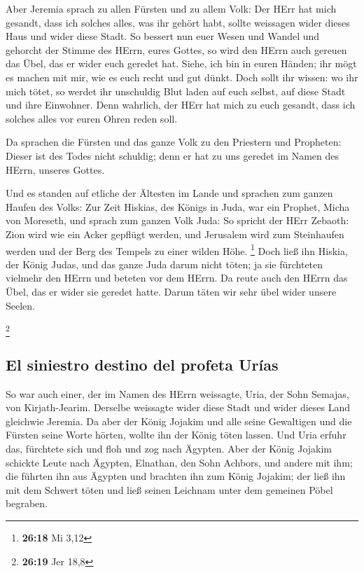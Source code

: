  Aber Jeremia sprach zu allen Fürsten und zu allem Volk:
Der HErr hat mich gesandt, dass ich solches alles, was ihr gehört habt,
sollte weissagen wider dieses Haus und wider diese Stadt.
 So bessert nun euer Wesen und Wandel und gehorcht der
Stimme des HErrn, eures Gottes, so wird den HErrn auch gereuen das Übel,
das er wider euch geredet hat.  Siehe, ich bin in euren
Händen; ihr mögt es machen mit mir, wie es euch recht und gut dünkt.
 Doch sollt ihr wissen: wo ihr mich tötet, so werdet ihr
unschuldig Blut laden auf euch selbst, auf diese Stadt und ihre
Einwohner. Denn wahrlich, der HErr hat mich zu euch gesandt, dass ich
solches alles vor euren Ohren reden soll.

 Da sprachen die Fürsten und das ganze Volk zu den
Priestern und Propheten: Dieser ist des Todes nicht schuldig; denn er
hat zu uns geredet im Namen des HErrn, unseres Gottes.

 Und es standen auf etliche der Ältesten im Lande und
sprachen zum ganzen Haufen des Volks:  Zur Zeit Hiskias,
des Königs in Juda, war ein Prophet, Micha von Moreseth, und sprach zum
ganzen Volk Juda: So spricht der HErr Zebaoth: Zion wird wie ein Acker
gepflügt werden, und Jerusalem wird zum Steinhaufen werden und der Berg
des Tempels zu einer wilden Höhe. \footnote{\textbf{26:18} Mi 3,12}
 Doch ließ ihn Hiskia, der König Judas, und das ganze
Juda darum nicht töten; ja sie fürchteten vielmehr den HErrn und beteten
vor dem HErrn. Da reute auch den HErrn das Übel, das er wider sie
geredet hatte. Darum täten wir sehr übel wider unsere Seelen.

\footnote{\textbf{26:19} Jer 18,8}

\hypertarget{el-siniestro-destino-del-profeta-uruxedas}{%
\subsection{El siniestro destino del profeta
Urías}\label{el-siniestro-destino-del-profeta-uruxedas}}

 So war auch einer, der im Namen des HErrn weissagte,
Uria, der Sohn Semajas, von Kirjath-Jearim. Derselbe weissagte wider
diese Stadt und wider dieses Land gleichwie Jeremia.  Da
aber der König Jojakim und alle seine Gewaltigen und die Fürsten seine
Worte hörten, wollte ihn der König töten lassen. Und Uria erfuhr das,
fürchtete sich und floh und zog nach Ägypten.  Aber der
König Jojakim schickte Leute nach Ägypten, Elnathan, den Sohn Achbors,
und andere mit ihm;  die führten ihn aus Ägypten und
brachten ihn zum König Jojakim; der ließ ihn mit dem Schwert töten und
ließ seinen Leichnam unter dem gemeinen Pöbel begraben.

